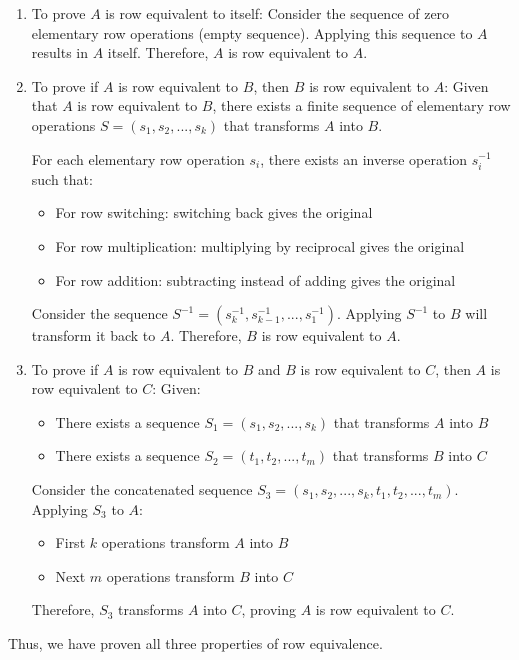 \documentclass{article}
\begin{document}
\begin{enumerate}[label=(\alph*)]
\item To prove $A$ is row equivalent to itself:
    Consider the sequence of zero elementary row operations (empty sequence).
    Applying this sequence to $A$ results in $A$ itself.
    Therefore, $A$ is row equivalent to $A$.

\item To prove if $A$ is row equivalent to $B$, then $B$ is row equivalent to $A$:
    Given that $A$ is row equivalent to $B$, there exists a finite sequence of elementary row operations
    $S = (s_1, s_2, ..., s_k)$ that transforms $A$ into $B$.
    
    For each elementary row operation $s_i$, there exists an inverse operation $s_i^{-1}$ such that:
    \begin{itemize}
        \item For row switching: switching back gives the original
        \item For row multiplication: multiplying by reciprocal gives the original
        \item For row addition: subtracting instead of adding gives the original
    \end{itemize}
    
    Consider the sequence $S^{-1} = (s_k^{-1}, s_{k-1}^{-1}, ..., s_1^{-1})$.
    Applying $S^{-1}$ to $B$ will transform it back to $A$.
    Therefore, $B$ is row equivalent to $A$.

\item To prove if $A$ is row equivalent to $B$ and $B$ is row equivalent to $C$, then $A$ is row equivalent to $C$:
    Given:
    \begin{itemize}
        \item There exists a sequence $S_1 = (s_1, s_2, ..., s_k)$ that transforms $A$ into $B$
        \item There exists a sequence $S_2 = (t_1, t_2, ..., t_m)$ that transforms $B$ into $C$
    \end{itemize}
    
    Consider the concatenated sequence $S_3 = (s_1, s_2, ..., s_k, t_1, t_2, ..., t_m)$.
    Applying $S_3$ to $A$:
    \begin{itemize}
        \item First $k$ operations transform $A$ into $B$
        \item Next $m$ operations transform $B$ into $C$
    \end{itemize}
    
    Therefore, $S_3$ transforms $A$ into $C$, proving $A$ is row equivalent to $C$.
\end{enumerate}

Thus, we have proven all three properties of row equivalence.
\end{document}
